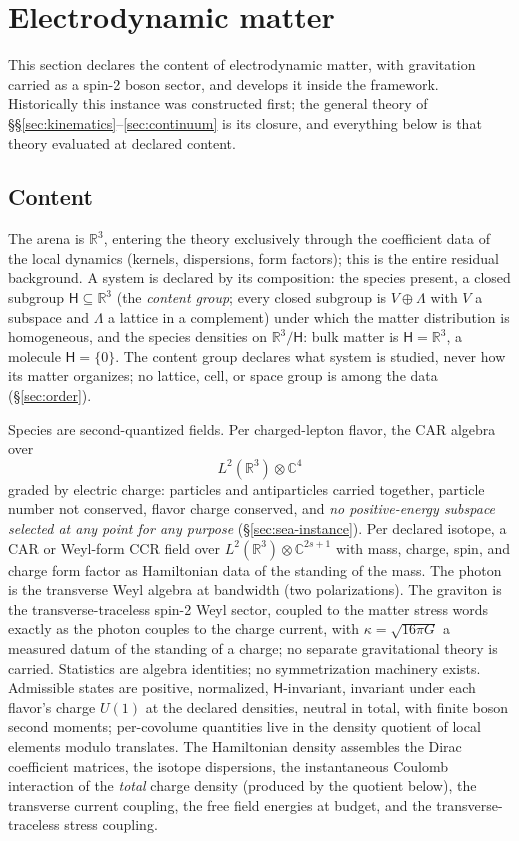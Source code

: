 \documentclass[11pt]{article}
\theoremstyle{definition}
\theoremstyle{remark}
\begin{document}
\section{Electrodynamic matter}
\label{sec:subsumption}

This section declares the content of electrodynamic matter, with
gravitation carried as a spin-2 boson sector, and develops it inside the
framework.  Historically this instance was constructed first; the general
theory of \S\S\ref{sec:kinematics}--\ref{sec:continuum} is its closure,
and everything below is that theory evaluated at declared content.

\subsection{Content}\label{sec:qedcontent}
The arena is $\mathbb R^3$, entering the theory exclusively through the
coefficient data of the local dynamics (kernels, dispersions, form
factors); this is the entire residual background.  A system is declared
by its composition: the species present, a closed subgroup $\mathsf H
\subseteq \mathbb R^3$ (the \emph{content group}; every closed subgroup
is $V \oplus \Lambda$ with $V$ a subspace and $\Lambda$ a lattice in a
complement) under which the matter distribution is homogeneous, and the
species densities on $\mathbb R^3/\mathsf H$: bulk matter is $\mathsf H =
\mathbb R^3$, a molecule $\mathsf H = \{0\}$.  The content group declares
what system is studied, never how its matter organizes; no lattice,
cell, or space group is among the data (\S\ref{sec:order}).

Species are second-quantized fields.  Per charged-lepton flavor, the CAR
algebra over
\[
L^2(\mathbb R^3) \otimes \mathbb C^4
\]
graded by electric
charge: particles and antiparticles carried together, particle number
not conserved, flavor charge conserved, and \emph{no positive-energy
subspace selected at any point for any purpose}
(\S\ref{sec:sea-instance}).  Per declared isotope, a CAR or Weyl-form CCR
field over $L^2(\mathbb R^3) \otimes \mathbb C^{2s+1}$ with mass, charge,
spin, and charge form factor as Hamiltonian data of the standing of the
mass.  The photon is the transverse Weyl algebra at bandwidth (two
polarizations).  The graviton is the transverse-traceless spin-2 Weyl
sector, coupled to the matter stress words exactly as the photon couples
to the charge current, with $\kappa = \sqrt{16\pi G}$ a measured datum of
the standing of a charge; no separate gravitational theory is carried.
Statistics are algebra identities; no symmetrization machinery exists.
Admissible states are positive, normalized, $\mathsf H$-invariant,
invariant under each flavor's charge $U(1)$ at the declared densities,
neutral in total, with finite boson second moments; per-covolume
quantities live in the density quotient of local elements modulo
translates.  The Hamiltonian density assembles the Dirac coefficient
matrices, the isotope dispersions, the instantaneous Coulomb interaction
of the \emph{total} charge density (produced by the quotient below), the
transverse current coupling, the free field energies at budget, and the
transverse-traceless stress coupling.
\end{document}

